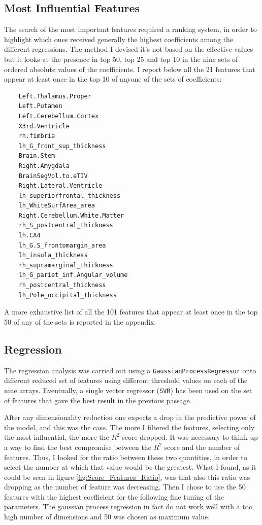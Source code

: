 \documentclass[11pt,a4paper]{report}
\begin{document}
\subsection*{Most Influential Features}
The search of the most important features required a ranking system, in order to highlight which ones received generally the highest coefficients among the different regressions. The method I devised it's not based on the effective values but it looks at the presence in top 50, top 25 and top 10 in the nine sets of ordered absolute values of the coefficients. I report below all the 21 features that appear at least once in the top 10 of anyone of the sets of coefficients:

\begin{multicols}{2}
  \begin{verbatim}
    Left.Thalamus.Proper
    Left.Putamen
    Left.Cerebellum.Cortex
    X3rd.Ventricle
    rh.fimbria
    lh_G_front_sup_thickness
    Brain.Stem
    Right.Amygdala
    BrainSegVol.to.eTIV
    Right.Lateral.Ventricle
    lh_superiorfrontal_thickness
    lh_WhiteSurfArea_area
    Right.Cerebellum.White.Matter
    rh_S_postcentral_thickness
    lh.CA4
    lh_G.S_frontomargin_area
    lh_insula_thickness
    rh_supramarginal_thickness
    lh_G_pariet_inf.Angular_volume
    rh_postcentral_thickness
    lh_Pole_occipital_thickness
\end{verbatim}
\end{multicols}

A more exhaustive list of all the 101 features that appear at least once in the top 50 of any of the sets is reported in the appendix.

\subsection*{Regression}
The regression analysis was carried out using a \texttt{GaussianProcessRegressor} onto different reduced set of features using different threshold values on each of the nine arrays. Eventually, a single vector regressor (\texttt{SVR}) has been used on the set of features that gave the best result in the previous passage.

After any dimensionality reduction one expects a drop in the predictive power of the model, and this was the case. The more I filtered the features, selecting only the most influential, the more the $R^{2}$ score dropped. It was necessary to think up a way to find the best compromise between the $R^{2}$ score and the number of features. Thus, I looked for the ratio between these two quantities, in order to select the number at which that value would be the greatest. What I found, as it could be seen in figure \ref{fig:Score_Features_Ratio}, was that also this ratio was dropping as the number of feature was decreasing. Then I chose to use the 50 features with the highest coefficient for the following fine tuning of the parameters. The gaussian process regression in fact do not work well with a too high number of dimensions and 50 was chosen as maximum value.
\end{document}
